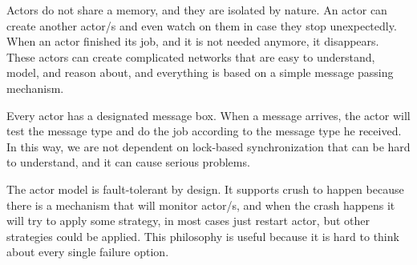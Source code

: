 \noindent
Actors do not share a memory, and they are isolated by nature. An actor can create another actor/s and even watch on them in case they stop unexpectedly. When an actor finished its job, and it is not needed anymore, it disappears. These actors can create complicated networks that are easy to understand, model, and reason about, and everything is based on a simple message passing mechanism. 

Every actor has a designated message box. When a message arrives, the actor will test the message type and do the job according to the message type he received. In this way, we are not dependent on lock-based synchronization that can be hard to understand, and it can cause serious problems.

The actor model is fault-tolerant by design. It supports crush to happen because there is a  mechanism that will monitor actor/s, and when the crash happens it will try to apply some strategy, in most cases just restart actor, but other strategies could be applied. This philosophy is useful because it is hard to think about every single failure option.
%
%
